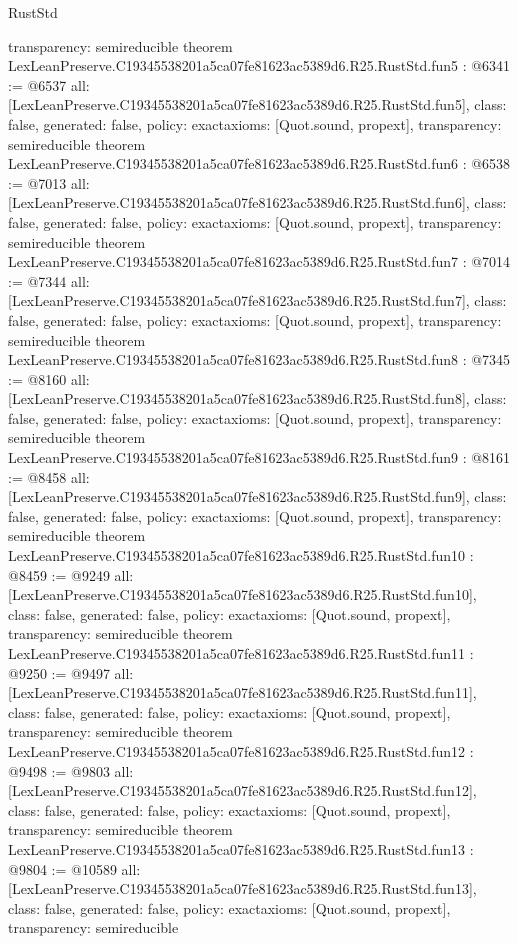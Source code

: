 \begin{lexlean}{RustStd}
\begin{coremodule}
{  transparency: semireducible
}
theorem LexLeanPreserve.C19345538201a5ca07fe81623ac5389d6.R25.RustStd.fun5 : @6341 := @6537 {
  all: [LexLeanPreserve.C19345538201a5ca07fe81623ac5389d6.R25.RustStd.fun5],
  class: false,
  generated: false,
  policy: exact{axioms: [Quot.sound, propext]},
  transparency: semireducible
}
theorem LexLeanPreserve.C19345538201a5ca07fe81623ac5389d6.R25.RustStd.fun6 : @6538 := @7013 {
  all: [LexLeanPreserve.C19345538201a5ca07fe81623ac5389d6.R25.RustStd.fun6],
  class: false,
  generated: false,
  policy: exact{axioms: [Quot.sound, propext]},
  transparency: semireducible
}
theorem LexLeanPreserve.C19345538201a5ca07fe81623ac5389d6.R25.RustStd.fun7 : @7014 := @7344 {
  all: [LexLeanPreserve.C19345538201a5ca07fe81623ac5389d6.R25.RustStd.fun7],
  class: false,
  generated: false,
  policy: exact{axioms: [Quot.sound, propext]},
  transparency: semireducible
}
theorem LexLeanPreserve.C19345538201a5ca07fe81623ac5389d6.R25.RustStd.fun8 : @7345 := @8160 {
  all: [LexLeanPreserve.C19345538201a5ca07fe81623ac5389d6.R25.RustStd.fun8],
  class: false,
  generated: false,
  policy: exact{axioms: [Quot.sound, propext]},
  transparency: semireducible
}
theorem LexLeanPreserve.C19345538201a5ca07fe81623ac5389d6.R25.RustStd.fun9 : @8161 := @8458 {
  all: [LexLeanPreserve.C19345538201a5ca07fe81623ac5389d6.R25.RustStd.fun9],
  class: false,
  generated: false,
  policy: exact{axioms: [Quot.sound, propext]},
  transparency: semireducible
}
theorem LexLeanPreserve.C19345538201a5ca07fe81623ac5389d6.R25.RustStd.fun10 : @8459 := @9249 {
  all: [LexLeanPreserve.C19345538201a5ca07fe81623ac5389d6.R25.RustStd.fun10],
  class: false,
  generated: false,
  policy: exact{axioms: [Quot.sound, propext]},
  transparency: semireducible
}
theorem LexLeanPreserve.C19345538201a5ca07fe81623ac5389d6.R25.RustStd.fun11 : @9250 := @9497 {
  all: [LexLeanPreserve.C19345538201a5ca07fe81623ac5389d6.R25.RustStd.fun11],
  class: false,
  generated: false,
  policy: exact{axioms: [Quot.sound, propext]},
  transparency: semireducible
}
theorem LexLeanPreserve.C19345538201a5ca07fe81623ac5389d6.R25.RustStd.fun12 : @9498 := @9803 {
  all: [LexLeanPreserve.C19345538201a5ca07fe81623ac5389d6.R25.RustStd.fun12],
  class: false,
  generated: false,
  policy: exact{axioms: [Quot.sound, propext]},
  transparency: semireducible
}
theorem LexLeanPreserve.C19345538201a5ca07fe81623ac5389d6.R25.RustStd.fun13 : @9804 := @10589 {
  all: [LexLeanPreserve.C19345538201a5ca07fe81623ac5389d6.R25.RustStd.fun13],
  class: false,
  generated: false,
  policy: exact{axioms: [Quot.sound, propext]},
  transparency: semireducible
}
\end{coremodule}
\end{lexlean}
